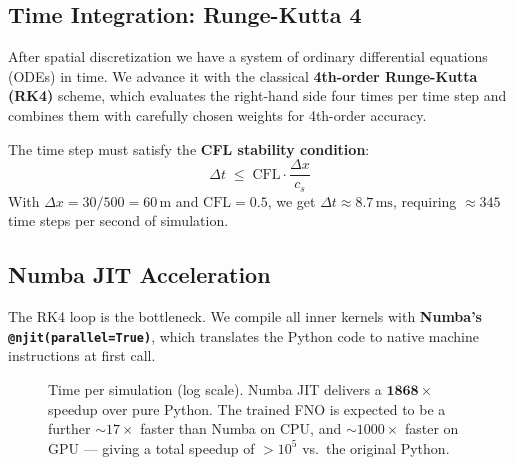 \documentclass[12pt, a4paper]{article}
\theoremstyle{definition}
\begin{document}
\subsection{Time Integration: Runge-Kutta 4}

After spatial discretization we have a system of ordinary differential equations
(ODEs) in time.  We advance it with the classical \textbf{4th-order Runge-Kutta
(RK4)} scheme, which evaluates the right-hand side four times per time step
and combines them with carefully chosen weights for 4th-order accuracy.

The time step must satisfy the \textbf{CFL stability condition}:
\[
  \Delta t \;\le\; \text{CFL} \cdot \frac{\Delta x}{c_s}
\]
With $\Delta x = 30/500 = 60\,\text{m}$ and $\text{CFL} = 0.5$, we get
$\Delta t \approx 8.7\,\text{ms}$, requiring $\approx\!345$ time steps per
second of simulation.

\subsection{Numba JIT Acceleration}

The RK4 loop is the bottleneck.  We compile all inner kernels with
\textbf{Numba's \texttt{@njit(parallel=True)}}, which translates the
Python code to native machine instructions at first call.

\begin{figure}[H]
  \centering
  \caption{Time per simulation (log scale).  Numba JIT delivers a $\mathbf{1868\times}$
           speedup over pure Python.  The trained FNO is expected to be a further
           $\sim 17\times$ faster than Numba on CPU, and $\sim 1000\times$ faster
           on GPU — giving a total speedup of $>10^5$ vs.\ the original Python.}
  \label{fig:speedup}
\end{figure}
\end{document}
